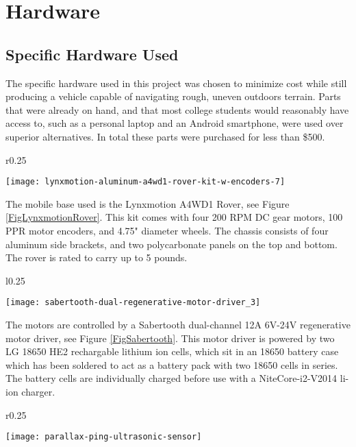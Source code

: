 \chapter{Hardware}

\section{Specific Hardware Used} \label{sectionSpecificHardware}
The specific hardware used in this project was chosen to minimize cost while still producing a vehicle capable of navigating rough, uneven outdoors terrain. Parts that were already on hand, and that most college students would reasonably have access to, such as a personal laptop and an Android smartphone, were used over superior alternatives. In total these parts were purchased for less than \$500.
\begin{wrapfigure}{r}{0.25\textwidth} %
	\caption{Lynxmotion 4WD Rover \cite{fig_lynxmotion_rover}}
	\centering
	\texttt{[image: lynxmotion-aluminum-a4wd1-rover-kit-w-encoders-7]}
	\label{FigLynxmotionRover}
\end{wrapfigure}

The mobile base used is the Lynxmotion A4WD1 Rover, see Figure \ref{FigLynxmotionRover}. This kit comes with four 200 RPM DC gear motors, 100 PPR motor encoders, and 4.75" diameter wheels. The chassis consists of four aluminum side brackets, and two polycarbonate panels on the top and bottom. The rover is rated to carry up to 5 pounds.

\begin{wrapfigure}{l}{0.25\textwidth}
	\caption{Sabertooth 2x12 \cite{fig_sabertooth}}
	\centering
	\texttt{[image: sabertooth-dual-regenerative-motor-driver\_3]}
	\label{FigSabertooth}
\end{wrapfigure}

The motors are controlled by a Sabertooth dual-channel 12A 6V-24V regenerative motor driver, see Figure \ref{FigSabertooth}. This motor driver is powered by two LG 18650 HE2 rechargable lithium ion cells, which sit in an 18650 battery case which has been soldered to act as a battery pack with two 18650 cells in series. The battery cells are individually charged before use with a NiteCore-i2-V2014 li-ion charger.

\begin{wrapfigure}{r}{0.25\textwidth} %
	\caption{PING))) Ultrasonic Sensor \cite{fig_ping}}
	\centering
	\texttt{[image: parallax-ping-ultrasonic-sensor]}
	\label{FigPing}
\end{wrapfigure}

